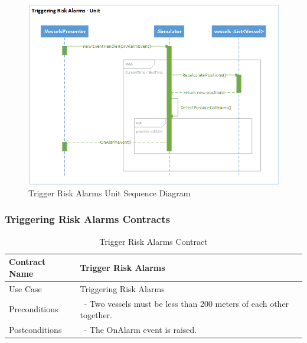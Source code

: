 \documentclass[12pt]{article}
\begin{document}
\begin{figure}[h!]
    \centering
    \includegraphics[scale=0.85]{4_triggering_risk_alarms_unit}    
    \caption{Trigger Risk Alarms Unit Sequence Diagram}
    \label{fig:TriggerRiskAlarmsUnitSequenceDiagram}
\end{figure}

\subsubsection{Triggering Risk Alarms Contracts}

\begin{table}[ht]
\centering
   \begin{tabular}{|l|l|}
        \hline
        Contract Name & Trigger Risk Alarms\\
        \hline
        Use Case & Triggering Risk Alarms\\
        \hline
        Preconditions & \ - Two vessels must be less than 200 meters of each other together.\\                      
        \hline
        Postconditions & \ - The OnAlarm event is raised.\\                       
        \hline
    \end{tabular}
\caption{Trigger Risk Alarms Contract}
\end{table}

\clearpage

\end{document}
